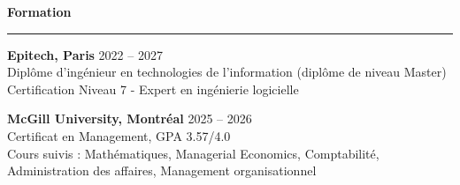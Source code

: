 \documentclass[9pt]{extarticle}
\begin{document}
\par\vspace{8pt}


{\large\bfseries Formation}
\par\vspace{-8pt}
\rule{\linewidth}{0.4pt}
\par\vspace{5pt}

{\bfseries Epitech, Paris} \hfill 2022 -- 2027 \\
Diplôme d'ingénieur en technologies de l'information (diplôme de niveau Master) \\
Certification Niveau 7 - Expert en ingénierie logicielle

\vspace{6pt}

{\bfseries McGill University, Montréal} \hfill 2025 -- 2026 \\
Certificat en Management, GPA 3.57/4.0 \\
Cours suivis : Mathématiques, Managerial Economics, Comptabilité, Administration des affaires, Management organisationnel
\end{document}
